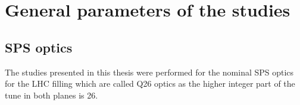 \vspace*{-1mm}


\section{General parameters of the studies}
\subsection{SPS optics}\label{subsec:SPS_optics_model}
 The studies presented in this thesis were performed for the nominal SPS optics for the LHC filling which are called Q26 optics as the higher integer part of the tune in both planes is 26. 

